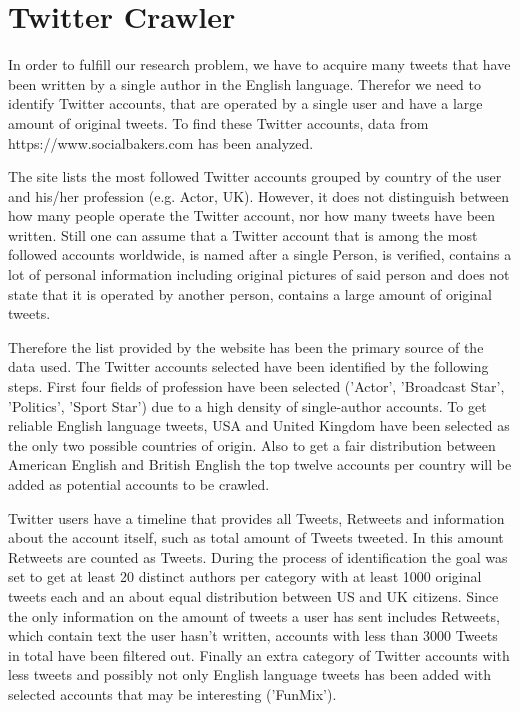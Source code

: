 \documentclass[journal, a4paper, 12pt]{IEEEtran}
\begin{document}
\section{Twitter Crawler}
In order to fulfill our research problem, we have to acquire many tweets that have been written by a single author in the English language. Therefor we need to identify Twitter accounts, that are operated by a single user and have a large amount of original tweets. To find these Twitter accounts, data from https://www.socialbakers.com has been analyzed. 

The site lists the most followed Twitter accounts grouped by country of the user and his/her profession (e.g. Actor, UK). However, it does not distinguish between how many people operate the Twitter account, nor how many tweets have been written. Still one can assume that a Twitter account that is among the most followed accounts worldwide, is named after a single Person, is verified, contains a lot of personal information including original pictures of said person and does not state that it is operated by another person, contains a large amount of original tweets. 

Therefore the list provided by the website has been the primary source of the data used. The Twitter accounts selected have been identified by the following steps. First four fields of profession have been selected ('Actor', 'Broadcast Star', 'Politics', 'Sport Star') due to a high density of single-author accounts. To get reliable English language tweets, USA and United Kingdom have been selected as the only two possible countries of origin. Also to get a fair distribution between American English and British English the top twelve accounts per country will be added as potential accounts to be crawled. 

Twitter users have a timeline that provides all Tweets, Retweets and information about the account itself, such as total amount of Tweets tweeted. In this amount Retweets are counted as Tweets. During the process of identification the goal was set to get at least 20 distinct authors per category with at least 1000 original tweets each and an about equal distribution between US and UK citizens. Since the only information on the amount of tweets a user has sent includes Retweets, which contain text the user hasn't written, accounts with less than 3000 Tweets in total have been filtered out. Finally an extra category of Twitter accounts with less tweets and possibly not only English language tweets has been added with selected accounts that may be interesting ('FunMix'). 
\end{document}
